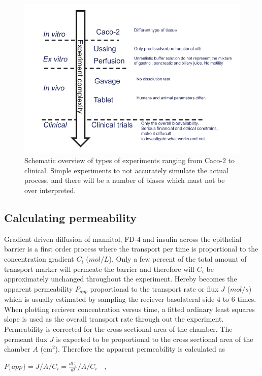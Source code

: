 \begin{figure}[ht]
\label{devel_typeOf}
\includegraphics{graphics/typeOfExperiments.pdf}
\caption{Schematic overview of types of experiments ranging from Caco-2 to clinical. Simple experiments to not accurately simulate the actual process, and there will be a number of biases which must not be over interpreted.}
\end{figure}


\subsection{Calculating permeability}
Gradient driven diffusion of mannitol, FD-4 and insulin across the epithelial barrier is a first order process where the transport per time is proportional to the concentration gradient $C_i$ ($mol/L$). Only a few percent of the total amount of transport marker will permeate the barrier and therefore will $C_i$ be approximately unchanged throughout the experiment. Hereby becomes the apparent permeability $P_{app}$ proportional to the transport rate or flux $J$ ($mol/s$) which is usually estimated by sampling the reciever basolateral side 4 to 6 times. When plotting reciever concentration versus time, a fitted ordinary least squares slope is used as the overall transport rate through out the experiment. Permeability is corrected for the cross sectional area of the chamber. The permeant flux $J$ is expected to be proportional to the cross sectional area of the chamber $A$ (cm$^2$). Therefore the apparent permeability is  calculated as

$P_\{app\} = J/A/C_i = \frac{dC_r}{dt}/A/C_i \quad ,$


